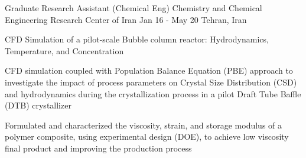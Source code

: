 \cventry
    {Graduate Research Assistant (Chemical Eng)} %
    {Chemistry and Chemical Engineering Research Center of Iran} %
    {Jan 16 - May 20} %
    {Tehran, Iran} %
    {
        \begin{cvitemsfree} %
            \item{CFD Simulation of a pilot-scale Bubble column reactor: Hydrodynamics, Temperature, and Concentration}
            \item{CFD simulation coupled with Population Balance Equation (PBE) approach to investigate the impact of process parameters on Crystal Size Distribution (CSD) and hydrodynamics during the crystallization process in a pilot Draft Tube Baffle (DTB) crystallizer}
            \item{Formulated and characterized the viscosity, strain, and storage modulus of a polymer composite, using experimental design (DOE), to achieve low viscosity final product and improving the production process}
        \end{cvitemsfree}
    }